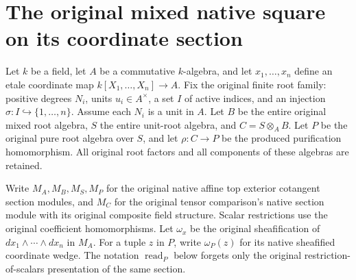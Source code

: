 \section{The original mixed native square on its coordinate section}

Let $k$ be a field, let $A$ be a commutative $k$-algebra, and let
$x_1,\ldots,x_n$ define an etale coordinate map
$k[X_1,\ldots,X_n]\to A$. Fix the original finite root family:
positive degrees $N_i$, units $u_i\in A^\times$, a set $I$ of active
indices, and an injection $\sigma:I\hookrightarrow\{1,\ldots,n\}$.
Assume each $N_i$ is a unit in $A$. Let $B$ be the entire original
mixed root algebra, $S$ the entire unit-root algebra, and
$C=S\otimes_A B$. Let $P$ be the original pure root algebra over $S$,
and let $\rho:C\to P$ be the produced purification homomorphism.
All original root factors and all components of these algebras are retained.

Write $M_A,M_B,M_S,M_P$ for the original native affine top exterior
cotangent section modules, and $M_C$ for the original tensor comparison's
native section module with its original composite field structure.
Scalar restrictions use the original coefficient homomorphisms.
Let $\omega_x$ be the original sheafification of
$dx_1\wedge\cdots\wedge dx_n$ in $M_A$. For a tuple $z$ in $P$,
write $\omega_P(z)$ for its native sheafified coordinate wedge.
The notation $\operatorname{read}_P$ below forgets only the original
restriction-of-scalars presentation of the same section.

